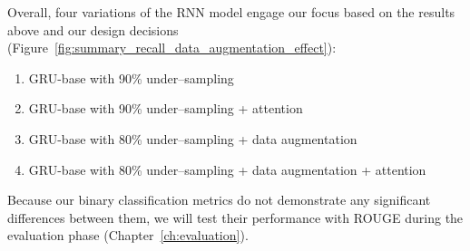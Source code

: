 Overall, four variations of the RNN model engage our focus based on the results above and our design decisions (Figure~\ref{fig:summary_recall_data_augmentation_effect}):
\begin{enumerate}
    \item GRU-base with 90\% under--sampling
    \item GRU-base with 90\% under--sampling + attention
    \item GRU-base with 80\% under--sampling + data augmentation
    \item GRU-base with 80\% under--sampling + data augmentation + attention
\end{enumerate}
Because our binary classification metrics do not demonstrate any significant differences between them, we will
test their performance with ROUGE during the evaluation phase (Chapter~\ref{ch:evaluation}).